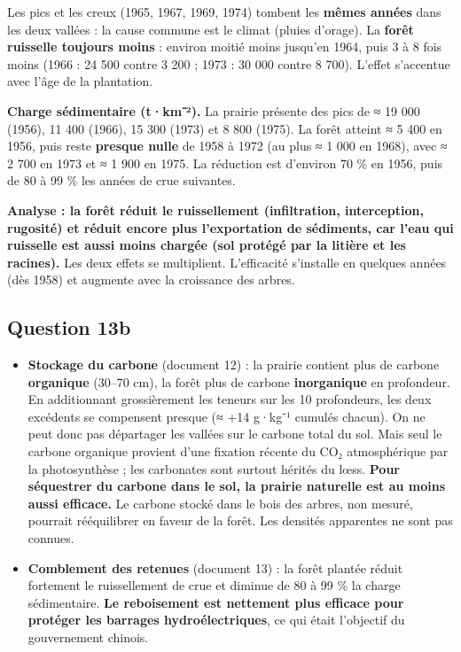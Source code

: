 \documentclass[11pt,a4paper]{article}
\providecommand{\tightlist}{\setlength{\itemsep}{0pt}\setlength{\parskip}{0pt}}
\begin{document}
Les pics et les creux (1965, 1967, 1969, 1974) tombent les \textbf{mêmes années} dans les deux vallées : la cause commune est le climat (pluies d'orage). La \textbf{forêt ruisselle toujours moins} : environ moitié moins jusqu'en 1964, puis 3 à 8 fois moins (1966 : 24 500 contre 3 200 ; 1973 : 30 000 contre 8 700). L'effet s'accentue avec l'âge de la plantation.

\textbf{Charge sédimentaire (t·km⁻²).} La prairie présente des pics de ≈ 19 000 (1956), 11 400 (1966), 15 300 (1973) et 8 800 (1975). La forêt atteint ≈ 5 400 en 1956, puis reste \textbf{presque nulle} de 1958 à 1972 (au plus ≈ 1 000 en 1968), avec ≈ 2 700 en 1973 et ≈ 1 900 en 1975. La réduction est d'environ 70 \% en 1956, puis de 80 à 99 \% les années de crue suivantes.

\textbf{Analyse : la forêt réduit le ruissellement (infiltration, interception, rugosité) et réduit encore plus l'exportation de sédiments, car l'eau qui ruisselle est aussi moins chargée (sol protégé par la litière et les racines).} Les deux effets se multiplient. L'efficacité s'installe en quelques années (dès 1958) et augmente avec la croissance des arbres.

\hypertarget{question-13b}{%
\subsection{Question 13b}\label{question-13b}}

\begin{itemize}
\tightlist
\item
  \textbf{Stockage du carbone} (document 12) : la prairie contient plus de carbone \textbf{organique} (30--70 cm), la forêt plus de carbone \textbf{inorganique} en profondeur. En additionnant grossièrement les teneurs sur les 10 profondeurs, les deux excédents se compensent presque (≈ +14 g·kg⁻¹ cumulés chacun). On ne peut donc pas départager les vallées sur le carbone total du sol. Mais seul le carbone organique provient d'une fixation récente du CO₂ atmosphérique par la photosynthèse ; les carbonates sont surtout hérités du lœss. \textbf{Pour séquestrer du carbone dans le sol, la prairie naturelle est au moins aussi efficace.} Le carbone stocké dans le bois des arbres, non mesuré, pourrait rééquilibrer en faveur de la forêt. Les densités apparentes ne sont pas connues.
\item
  \textbf{Comblement des retenues} (document 13) : la forêt plantée réduit fortement le ruissellement de crue et diminue de 80 à 99 \% la charge sédimentaire. \textbf{Le reboisement est nettement plus efficace pour protéger les barrages hydroélectriques}, ce qui était l'objectif du gouvernement chinois.
\end{itemize}
\end{document}
